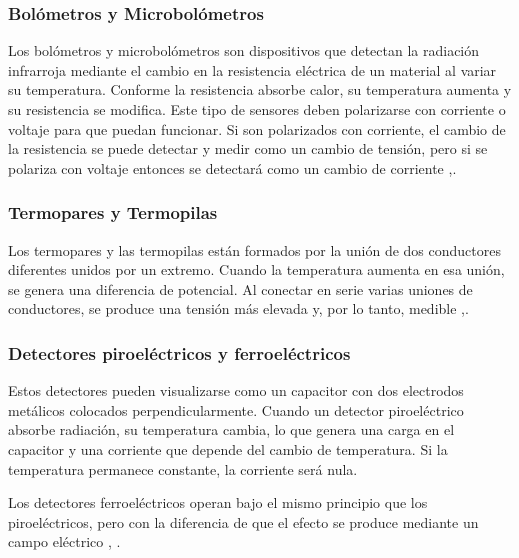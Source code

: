		\subsubsection{Bolómetros y Microbolómetros}
		Los bolómetros y microbolómetros son dispositivos que detectan la radiación infrarroja mediante el cambio en la resistencia eléctrica de un material al variar su temperatura. Conforme la resistencia absorbe calor, su temperatura aumenta y su resistencia se modifica.
Este tipo de sensores deben polarizarse con corriente o voltaje para que puedan funcionar.
Si son polarizados con corriente, el cambio de la resistencia se puede detectar y medir como un cambio de tensión, pero si se polariza con voltaje entonces se detectará como un cambio de corriente \cite{Rogalski},\cite{Vincent}.
		\subsubsection{Termopares y Termopilas}
		Los termopares y las termopilas están formados por la unión de dos conductores diferentes unidos por un extremo. Cuando la temperatura aumenta en esa unión, se genera una diferencia de potencial. Al conectar en serie varias uniones de conductores, se produce una tensión más elevada y, por lo tanto, medible \cite{Rogalski},\cite{Vincent}.
		
		\subsubsection{Detectores piroeléctricos y ferroeléctricos}
		Estos detectores pueden visualizarse como un capacitor con dos electrodos metálicos colocados perpendicularmente. Cuando un detector piroeléctrico absorbe radiación, su temperatura cambia, lo que genera una carga en el capacitor y una corriente que depende del cambio de temperatura. Si la temperatura permanece constante, la corriente será nula.

Los detectores ferroeléctricos operan bajo el mismo principio que los piroeléctricos, pero con la diferencia de que el efecto se produce mediante un campo eléctrico \cite{Rogalski}, \cite{BlancoMDA}.
		
